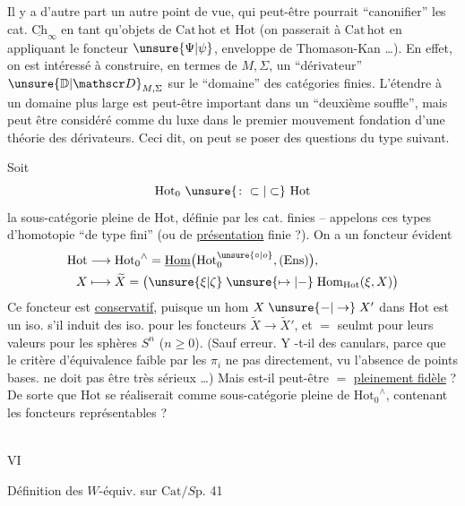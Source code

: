 Il y a d'autre part un autre point de vue,
qui peut-être pourrait ``canonifier'' les
cat. $\underline{\mathrm{Ch}}_\infty$ en tant qu'objets de $\mathrm{Cat}\,\mathrm{hot}$
et   $\mathrm{Hot}$ (on passerait à $\mathrm{Cat}\,\mathrm{hot}$ en
appliquant le foncteur $\unsure{\Psi|\psi}$, enveloppe de Thomason-Kan \ldots). En effet, on est intéressé à
construire, en termes de $M,\Sigma$, un ``dérivateur''
 $\unsure{\mathbb D|\mathscr D}_{M,\Sigma}$  sur le ``domaine'' des catégories
finies. L'étendre à un domaine plus large
est peut-être important dans un ``deuxième
souffle'', mais peut être considéré comme
du luxe dans le premier mouvement  fondation
d'une théorie des dérivateurs. Ceci dit,
on peut se poser des questions du type suivant.

Soit 
\[
\mathrm{Hot}_0\ \unsure{\colon\subset|\subset}\ \mathrm{Hot}
\]
la sous-catégorie pleine de $\mathrm{Hot}$, définie par les
cat. finies -- appelons ces types d'homotopie ``de type
fini'' (ou de \uline{présentation} finie ?). On a un
foncteur évident
\[
\begin{aligned}
\mathrm{Hot}&\longrightarrow {\mathrm{Hot}_0}^{\wedge}=\underline{\mathrm{Hom}}\bigl(\mathrm{Hot}_0^{\unsure{\circ|o}},(\mathrm{Ens})\bigr),\\
X&\longmapsto\widetilde X=\bigl(\unsure{\xi|\zeta}\mathrel{\unsure{\mapsto|-}}\mathrm{Hom}_{\mathrm{Hot}}(\xi,X)\bigr)
\end{aligned}
\]
Ce foncteur est \uline{conservatif}, puisque un hom
$X\mathrel{\unsure{-|\to}}X'$ dans $\mathrm{Hot}$ est un iso. s'il induit des
iso. pour les foncteurs $\widetilde X\to\widetilde X'$, et $=$ seulmt
pour leurs valeurs pour les sphères $S^n$ ($n\geq 0$).
(Sauf erreur.  Y -t-il des canulars,
parce que le  critère d'équivalence faible par
les $\pi_i$ ne   pas directement, vu l'absence
de points bases.  ne doit pas être très sérieux
\ldots)  Mais est-il peut-être $=$ \uline{pleinement fidèle} ?
De sorte que $\mathrm{Hot}$ se réaliserait comme sous-catégorie pleine de $ {\mathrm{Hot}_0}^{\wedge}$, contenant les
foncteurs représentables ? 
\begin{flushright}
\\
VI
\end{flushright}
Définition des $W$-équiv. sur $\mathrm{Cat}/S$\qquad p. 41

